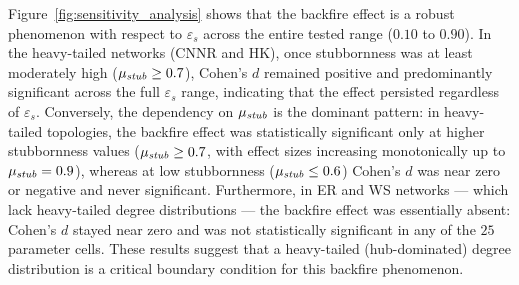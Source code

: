 \documentclass[pdflatex,sn-mathphys-num]{sn-jnl}%
\theoremstyle{thmstyleone}%
\theoremstyle{thmstyletwo}%
\theoremstyle{thmstylethree}%
\def\Black{\color[rgb]{0,0,0}}
\def\Stubbornness{\mu_{\it stub}}
\def\ThofOpPreval{\varepsilon_s}
\begin{document}
\Black
Figure~\ref{fig:sensitivity_analysis} shows that the backfire effect 
is a robust phenomenon with respect to $\ThofOpPreval$ across the 
entire tested range ($0.10$ to $0.90$). In the heavy-tailed networks 
(CNNR and HK), once stubbornness was at least
moderately high ($\Stubbornness \geq 0.7$),
Cohen's $d$ remained positive and predominantly significant across the 
full $\ThofOpPreval$ range, indicating that the effect persisted 
regardless of $\ThofOpPreval$. Conversely, the dependency on $\Stubbornness$ is 
the dominant pattern: in heavy-tailed topologies, the backfire effect 
was statistically significant only at higher stubbornness 
values ($\Stubbornness \geq 0.7$, with effect sizes increasing 
monotonically up to $\Stubbornness = 0.9$), whereas at low 
stubbornness ($\Stubbornness \leq 0.6$) Cohen's $d$ was near zero or 
negative and never significant. 
Furthermore, in ER and WS networks --- which lack heavy-tailed 
degree distributions --- the backfire effect was 
essentially absent: Cohen's $d$ stayed near zero and was not 
statistically significant in any of the $25$ parameter cells. 
These results suggest that a heavy-tailed (hub-dominated) 
degree distribution is a critical boundary condition for this backfire phenomenon.
\par
\end{document}
